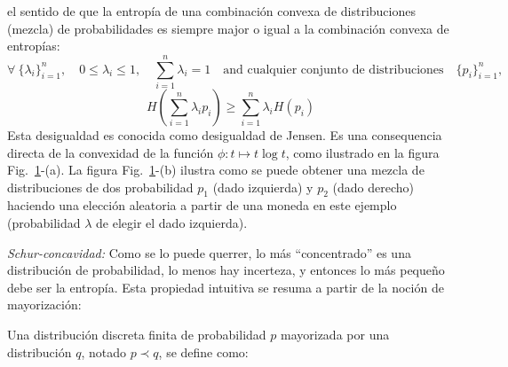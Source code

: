\begin{propiedades}
  el sentido de que la entrop\'ia de una combinaci\'on convexa de distribuciones
  (mezcla) de probabilidades es siempre major o igual a la combinaci\'on convexa
  de entrop\'ias:
  \[
  \forall  \:  \{ \lambda_i  \}_{i=1}^n,  \quad 0  \le  \lambda_i  \le 1,  \quad
  \sum_{i=1}^n   \lambda_i   =  1   \quad   \mbox{and   cualquier  conjunto   de
    distribuciones} \quad \{ p_i \}_{i=1}^n,
  \]
  \[
  H\left( \sum_{i=1}^n \lambda_i p_i \right) \ge \sum_{i=1}^n \lambda_i H(p_i)
  \]
  Esta desigualdad es conocida como  desigualdad de Jensen.  Es una consequencia
  directa de  la convexidad  de la funci\'on  $\phi: t  \mapsto t \log  t$, como
  ilustrado   en   la   figura  Fig.~\ref{fig:SZ:Concavidad}-(a).    La   figura
  Fig.~\ref{fig:SZ:Concavidad}-(b) ilustra  como se puede obtener  una mezcla de
  distribuciones  de  dos probabilidad  $p_1$  (dado  izquierda)  y $p_2$  (dado
  derecho)  haciendo una elecci\'on  aleatoria a  partir de  una moneda  en este
  ejemplo (probabilidad $\lambda$ de elegir el dado izquierda).\newline
  \begin{figure}[h!]
  \begin{center}  \end{center}
  \label{fig:SZ:Concavidad}
  \end{figure}
%
\setcounter{PropSchurConcavidad}{\value{enumi}}
\item\label{prop:SZ:Schurconcavidad}  {\it Schur-concavidad:}  Como se  lo puede
  querrer, lo  m\'as ``concentrado'' es  una distribuci\'on de  probabilidad, lo
  menos   hay  incerteza,   y  entonces   lo   m\'as  peque\~no   debe  ser   la
  entrop\'ia.  Esta propiedad intuitiva  se resuma  a partir  de la  noci\'on de
  mayorizaci\'on:
  \begin{definicion}[Mayorizaci\'on]\label{def:SZ:Mayorizacion}
    Una distribuci\'on  discreta finita de  probabilidad $p$ mayorizada  por una
    distribuci\'on $q$, notado $p \prec q$, se define como:

\end{definicion}
\end{propiedades}
